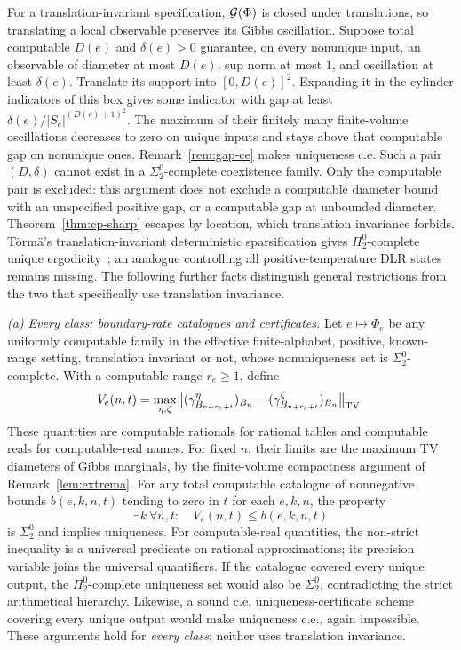 \begin{remark}\label{rem:hierarchy}
For a translation-invariant specification, $\mathcal G(\Phi)$ is closed under
translations, so translating a local observable preserves its Gibbs
oscillation. Suppose total computable $D(e)$ and $\delta(e)>0$ guarantee,
on every nonunique input, an observable of diameter at most $D(e)$, sup norm
at most $1$, and oscillation at least $\delta(e)$. Translate its support into
$[0,D(e)]^2$. Expanding it in the cylinder indicators of this box gives some
indicator with gap at least $\delta(e)/|S_e|^{(D(e)+1)^2}$.
The maximum of their finitely many finite-volume oscillations decreases to
zero on unique inputs and stays above that computable gap on nonunique ones.
Remark~\ref{rem:gap-ce} makes uniqueness c.e. Such a pair $(D,\delta)$ cannot
exist in a $\Sigma^0_2$-complete coexistence family. Only the computable pair is excluded: this argument does not exclude a computable diameter bound with an unspecified positive gap, or a computable gap at unbounded diameter.
Theorem~\ref{thm:cp-sharp} escapes by location, which translation invariance
forbids. T\"orm\"a's translation-invariant deterministic sparsification gives
$\Pi^0_2$-complete unique ergodicity~\cite[Proposition 48, arXiv numbering]{Torma2015};
an analogue controlling all positive-temperature DLR states remains missing.
The following further facts distinguish general restrictions from the two
that specifically use translation invariance.

\emph{(a) Every class: boundary-rate catalogues and certificates.}
Let $e\mapsto\Phi_e$ be any uniformly computable family in the effective
finite-alphabet, positive, known-range setting, translation invariant or not,
whose nonuniqueness set is $\Sigma^0_2$-complete. With a computable range $r_e\ge1$,
define
\[
 V_e(n,t)=\max_{\eta,\zeta}
 \bigl\|(\gamma_{B_{n+r_e+t}}^\eta)_{B_n}
        -(\gamma_{B_{n+r_e+t}}^\zeta)_{B_n}\bigr\|_{\mathrm{TV}}.
\]
These quantities are computable rationals for rational tables and computable
reals for computable-real names. For fixed $n$, their limits are the maximum
TV diameters of Gibbs marginals, by the finite-volume compactness argument
of Remark~\ref{lem:extrema}. For any total computable catalogue of nonnegative
bounds $b(e,k,n,t)$ tending to zero in $t$ for each $e,k,n$, the property
\[
 \exists k\ \forall n,t:\quad V_e(n,t)\le b(e,k,n,t)
\]
is $\Sigma^0_2$ and implies uniqueness. For computable-real quantities, the
non-strict inequality is a universal predicate on rational approximations;
its precision variable joins the universal quantifiers. If the catalogue
covered every unique output, the $\Pi^0_2$-complete uniqueness set would also
be $\Sigma^0_2$, contradicting the strict arithmetical hierarchy. Likewise,
a sound c.e. uniqueness-certificate scheme covering every unique output
would make uniqueness c.e., again impossible. These arguments hold for
\emph{every class}; neither uses translation invariance.


\end{remark}
